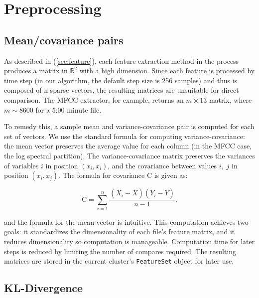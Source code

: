 \documentclass[12pt,twocolumn,titlepage]{article}
\begin{document}
\section{Preprocessing}
\label{sec:preprocessing}


\subsection{Mean/covariance pairs}

As described in (\ref{sec:feature}), each feature extraction method in the process produces a matrix in $\mathbb{R}^2$ with a high dimension. Since each feature is processed by time step (in our algorithm, the default step size is 256 samples) and thus is composed of n sparse vectors, the resulting matrices are unsuitable for direct comparison. The MFCC extractor, for example, returns an $m\times13$ matrix, where $m \sim 8600$ for a 5:00 minute file. 


To remedy this, a sample mean and variance-covariance pair is computed for each set of vectors. We use the standard formula for computing variance-covariance: the mean vector preserves the average value for each column (in the MFCC case, the log spectral partition). The variance-covariance matrix preserves the variances of variables $i$ in position $(x_i, x_i)$, and the covariance between values $i, \;j$ in position $(x_i, x_j)$. The formula for covariance $\mathrm{C}$ is given as:

\begin{equation}\label{}
\mathrm{C} = \sum_{i=1}^{n}{\frac{(X_i-\overline{X})(Y_i-\overline{Y})}{n-1}}.
\end{equation}


and the formula for the mean vector is intuitive. This computation achieves two goals: it standardizes the dimensionality of each file's feature matrix, and it reduces dimensionality so computation is manageable. Computation time for later steps is reduced by limiting the number of compares required. The resulting matrices are stored in the current cluster's \texttt{FeatureSet} object for later use.

\subsection{KL-Divergence}
\end{document}

